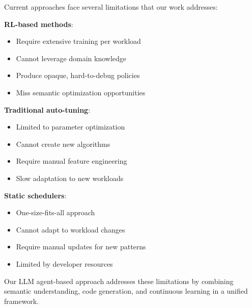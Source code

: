Current approaches face several limitations that our work addresses:

\textbf{RL-based methods}:
\begin{itemize}
\item Require extensive training per workload
\item Cannot leverage domain knowledge
\item Produce opaque, hard-to-debug policies
\item Miss semantic optimization opportunities
\end{itemize}

\textbf{Traditional auto-tuning}:
\begin{itemize}
\item Limited to parameter optimization
\item Cannot create new algorithms
\item Require manual feature engineering
\item Slow adaptation to new workloads
\end{itemize}

\textbf{Static schedulers}:
\begin{itemize}
\item One-size-fits-all approach
\item Cannot adapt to workload changes
\item Require manual updates for new patterns
\item Limited by developer resources
\end{itemize}

Our LLM agent-based approach addresses these limitations by combining semantic understanding, code generation, and continuous learning in a unified framework.